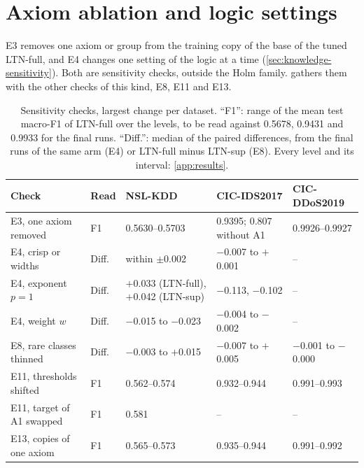 \section{Axiom ablation and logic settings}
\label{sec:res-knowledge}

E3 removes one axiom or group from the training copy of the base of the tuned LTN-full, and E4 changes one
setting of the logic at a time (\cref{sec:knowledge-sensitivity}). Both are sensitivity checks, outside the
Holm family.  gathers them with the other checks of this kind, E8, E11 and E13.

\begin{table}[t]
\centering
\footnotesize
\caption{Sensitivity checks, largest change per dataset. ``F1'': range of the mean test macro-F1 of LTN-full
over the levels, to be read against 0.5678, 0.9431 and 0.9933 for the final runs. ``Diff.'': median of the paired
differences, from the final runs of the same arm (E4) or LTN-full minus LTN-sup (E8). Every level and its
interval: \cref{app:results}.}
\label{tab:res-sensitivity}
\setlength{\tabcolsep}{3pt}
\begin{tabular}{@{}p{3.8cm}p{0.9cm}p{2.6cm}p{2.6cm}p{2.4cm}@{}}
\toprule
Check & Read & NSL-KDD & CIC-IDS2017 & CIC-DDoS2019 \\
\midrule
E3, one axiom removed   & F1    & 0.5630--0.5703 & 0.9395; 0.807 without A1 & 0.9926--0.9927 \\
E4, crisp or widths     & Diff. & within $\pm$0.002 & $-$0.007 to $+$0.001 & -- \\
E4, exponent $p=1$      & Diff. & $+$0.033 (LTN-full), $+$0.042 (LTN-sup) & $-$0.113, $-$0.102 & -- \\
E4, weight $w$          & Diff. & $-$0.015 to $-$0.023 & $-$0.004 to $-$0.002 & -- \\
E8, rare classes thinned & Diff. & $-$0.003 to $+$0.015 & $-$0.007 to $+$0.005 & $-$0.001 to $-$0.000 \\
E11, thresholds shifted & F1    & 0.562--0.574 & 0.932--0.944 & 0.991--0.993 \\
E11, target of A1 swapped & F1  & 0.581 & -- & -- \\
E13, copies of one axiom & F1   & 0.565--0.573 & 0.935--0.944 & 0.991--0.992 \\
\bottomrule
\end{tabular}
\end{table}


